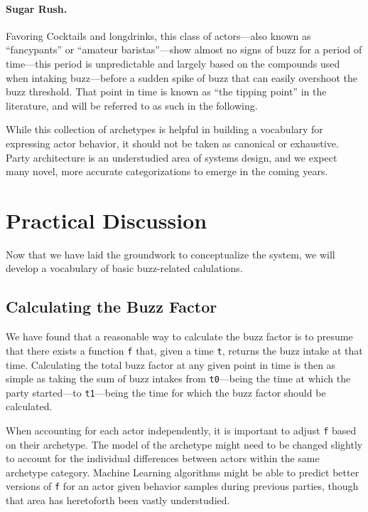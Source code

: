 \documentclass[twocolumn]{article}
\begin{document}
\paragraph{Sugar Rush.} Favoring Cocktails and longdrinks, this class of
actors—also known as “fancypants” or “amateur baristas”—show almost no signs of
buzz for a period of time—this period is unpredictable and largely based on the
compounds used when intaking buzz—before a sudden spike of buzz that can easily
overshoot the buzz threshold. That point in time is known as “the tipping point”
in the literature, and will be referred to as such in the following.

\bigskip

While this collection of archetypes is helpful in building a vocabulary for
expressing actor behavior, it should not be taken as canonical or exhaustive.
Party architecture is an understudied area of systems design, and we expect many
novel, more accurate categorizations to emerge in the coming years.

\section{Practical Discussion}

Now that we have laid the groundwork to conceptualize the system, we will
develop a vocabulary of basic buzz-related calulations.

\subsection{Calculating the Buzz Factor}

We have found that a reasonable way to calculate the buzz factor is to presume
that there exists a function \texttt{f} that, given a time \texttt{t}, returns
the buzz intake at that time. Calculating the total buzz factor at any given
point in time is then as simple as taking the sum of buzz intakes from
\texttt{t0}—being the time at which the party started—to \texttt{t1}—being the
time for which the buzz factor should be calculated.

When accounting for each actor independently, it is important to adjust \texttt{f} based on their archetype. The model of the archetype might need to
be changed slightly to account for the individual differences between actors
within the same archetype category. Machine Learning algorithms might be able
to predict better versions of \texttt{f} for an actor given behavior samples
during previous parties, though that area has heretoforth been vastly
understudied.
\end{document}
